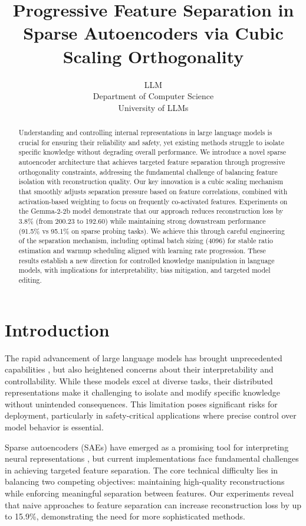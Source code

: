 \documentclass{article} %
\title{Progressive Feature Separation in Sparse Autoencoders via Cubic Scaling Orthogonality}
\author{LLM\\
Department of Computer Science\\
University of LLMs\\
}
\begin{document}
\maketitle

\begin{abstract}
Understanding and controlling internal representations in large language models is crucial for ensuring their reliability and safety, yet existing methods struggle to isolate specific knowledge without degrading overall performance. We introduce a novel sparse autoencoder architecture that achieves targeted feature separation through progressive orthogonality constraints, addressing the fundamental challenge of balancing feature isolation with reconstruction quality. Our key innovation is a cubic scaling mechanism that smoothly adjusts separation pressure based on feature correlations, combined with activation-based weighting to focus on frequently co-activated features. Experiments on the Gemma-2-2b model demonstrate that our approach reduces reconstruction loss by 3.8\% (from 200.23 to 192.60) while maintaining strong downstream performance (91.5\% vs 95.1\% on sparse probing tasks). We achieve this through careful engineering of the separation mechanism, including optimal batch sizing (4096) for stable ratio estimation and warmup scheduling aligned with learning rate progression. These results establish a new direction for controlled knowledge manipulation in language models, with implications for interpretability, bias mitigation, and targeted model editing.
\end{abstract}

\section{Introduction}
\label{sec:intro}

The rapid advancement of large language models has brought unprecedented capabilities \cite{gpt4}, but also heightened concerns about their interpretability and controllability. While these models excel at diverse tasks, their distributed representations make it challenging to isolate and modify specific knowledge without unintended consequences. This limitation poses significant risks for deployment, particularly in safety-critical applications where precise control over model behavior is essential.

Sparse autoencoders (SAEs) have emerged as a promising tool for interpreting neural representations \cite{goodfellow2016deep}, but current implementations face fundamental challenges in achieving targeted feature separation. The core technical difficulty lies in balancing two competing objectives: maintaining high-quality reconstructions while enforcing meaningful separation between features. Our experiments reveal that naive approaches to feature separation can increase reconstruction loss by up to 15.9\%, demonstrating the need for more sophisticated methods.
\end{document}
